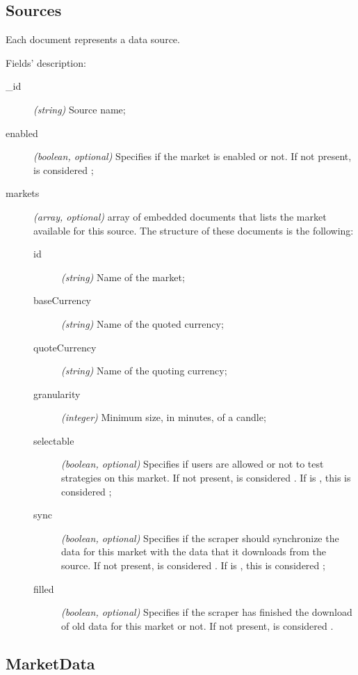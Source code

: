 \subsection{Sources}



Each document represents a data source.

Fields' description:
\begin{description}
	\item[\_id] \textit{(string)} Source name;
	\item[enabled] \textit{(boolean, optional)} Specifies if the market is
		enabled or not. If not present, is considered ;
	\item[markets] \textit{(array, optional)} array of embedded documents
		that lists the market available for this source. The structure
		of these documents is the following:
		\begin{description}
			\item[id] \textit{(string)} Name of the market;
			\item[baseCurrency] \textit{(string)} Name of the quoted
				currency;
			\item[quoteCurrency] \textit{(string)} Name of the
				quoting currency;
			\item[granularity] \textit{(integer)} Minimum size,
				in minutes, of a candle;
			\item[selectable] \textit{(boolean, optional)} Specifies
				if users are allowed or not to test strategies
				on this market. If not present, is considered
				. If  is ,
				this is considered ;
			\item[sync] \textit{(boolean, optional)} Specifies if
				the scraper should synchronize the data for this
				market with the data that it downloads from the
				source. If not present, is considered
				. If  is ,
				this is considered ;
			\item[filled] \textit{(boolean, optional)} Specifies if
				the scraper has finished the download of old
				data for this market or not. If not present, is
				considered .
		\end{description}
\end{description}

\subsection{MarketData}

